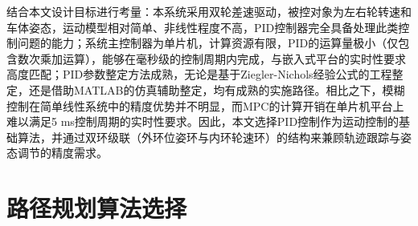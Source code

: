 {结合本文设计目标进行考量：本系统采用双轮差速驱动，被控对象为左右轮转速和车体姿态，运动模型相对简单、非线性程度不高，PID控制器完全具备处理此类控制问题的能力；系统主控制器为单片机，计算资源有限，PID的运算量极小（仅包含数次乘加运算），能够在毫秒级的控制周期内完成，与嵌入式平台的实时性要求高度匹配；PID参数整定方法成熟，无论是基于Ziegler-Nichols经验公式的工程整定，还是借助MATLAB的仿真辅助整定，均有成熟的实施路径。相比之下，模糊控制在简单线性系统中的精度优势并不明显，而MPC的计算开销在单片机平台上难以满足5 ms控制周期的实时性要求。因此，本文选择PID控制作为运动控制的基础算法，并通过双环级联（外环位姿环与内环轮速环）的结构来兼顾轨迹跟踪与姿态调节的精度需求。
}

    \section{路径规划算法选择}
